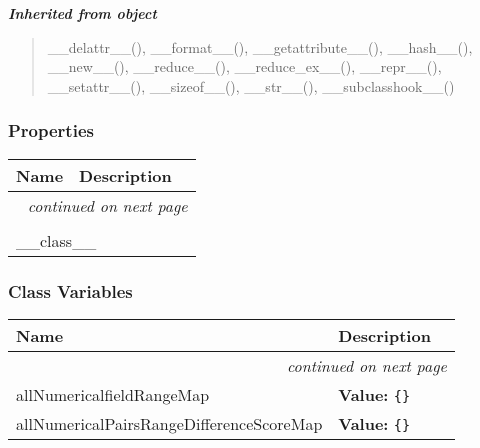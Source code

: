 \large{\textbf{\textit{Inherited from object}}}

\begin{quote}
\_\_delattr\_\_(), \_\_format\_\_(), \_\_getattribute\_\_(), \_\_hash\_\_(), \_\_new\_\_(), \_\_reduce\_\_(), \_\_reduce\_ex\_\_(), \_\_repr\_\_(), \_\_setattr\_\_(), \_\_sizeof\_\_(), \_\_str\_\_(), \_\_subclasshook\_\_()
\end{quote}


  \subsubsection{Properties}

    \vspace{-1cm}
\hspace{\varindent}\begin{longtable}{|p{\varnamewidth}|p{\vardescrwidth}|l}
\cline{1-2}
\cline{1-2} \centering \textbf{Name} & \centering \textbf{Description}& \\
\cline{1-2}
\endhead\cline{1-2}\multicolumn{3}{r}{\small\textit{continued on next page}}\\\endfoot\cline{1-2}
\endlastfoot\multicolumn{2}{|l|}{\textit{Inherited from object}}\\
\multicolumn{2}{|p{\varwidth}|}{\raggedright \_\_class\_\_}\\
\cline{1-2}
\end{longtable}



  \subsubsection{Class Variables}

    \vspace{-1cm}
\hspace{\varindent}\begin{longtable}{|p{\varnamewidth}|p{\vardescrwidth}|l}
\cline{1-2}
\cline{1-2} \centering \textbf{Name} & \centering \textbf{Description}& \\
\cline{1-2}
\endhead\cline{1-2}\multicolumn{3}{r}{\small\textit{continued on next page}}\\\endfoot\cline{1-2}
\endlastfoot\raggedright a\-l\-l\-N\-u\-m\-e\-r\-i\-c\-a\-l\-f\-i\-e\-l\-d\-R\-a\-n\-g\-e\-M\-a\-p\- & \raggedright \textbf{Value:} 
{\tt \texttt{\{}\texttt{\}}}&\\
\cline{1-2}
\raggedright a\-l\-l\-N\-u\-m\-e\-r\-i\-c\-a\-l\-P\-a\-i\-r\-s\-R\-a\-n\-g\-e\-D\-i\-f\-f\-e\-r\-e\-n\-c\-e\-S\-c\-o\-r\-e\-M\-a\-p\- & \raggedright \textbf{Value:} 
{\tt \texttt{\{}\texttt{\}}}&\\
\cline{1-2}
\end{longtable}

